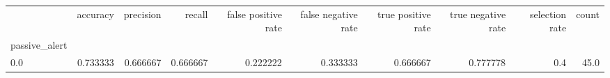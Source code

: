 \begin{tabular}{lrrrrrrrrr}
\toprule
{} &  accuracy &  precision &    recall &  false positive rate &  false negative rate &  true positive rate &  true negative rate &  selection rate &  count \\
passive\_alert &           &            &           &                      &                      &                     &                     &                 &        \\
\midrule
0.0           &  0.733333 &   0.666667 &  0.666667 &             0.222222 &             0.333333 &            0.666667 &            0.777778 &             0.4 &   45.0 \\
\bottomrule
\end{tabular}
